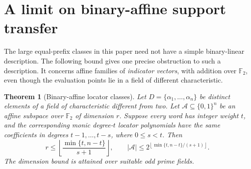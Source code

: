 \documentclass[11pt,letterpaper]{article}
\newtheorem{theorem}{Theorem}[section]
\theoremstyle{definition}
\theoremstyle{remark}
\begin{document}
\section{A limit on binary-affine support transfer}
\label{app:binary-affine}

The large equal-prefix classes in this paper need not have a simple
binary-linear description. The following bound gives one precise
obstruction to such a description. It concerns affine families of
\emph{indicator vectors}, with addition over $\mathbb F_2$, even
though the evaluation points lie in a field of different characteristic.

\begin{theorem}[Binary-affine locator classes]
\label{thm:binary-affine-locator}
Let $D=\{\alpha_1,\ldots,\alpha_n\}$ be distinct elements of a field
of characteristic different from two. Let $\mathcal A\subseteq\{0,1\}^n$
be an affine subspace over $\mathbb F_2$ of dimension $r$.
Suppose every word has integer weight $t$, and the corresponding
monic degree-$t$ locator polynomials have the same coefficients in
degrees $t-1,\ldots,t-s$, where $0\le s<t$. Then
\[
 r\le\left\lfloor\frac{\min\{t,n-t\}}{s+1}\right\rfloor,
 \qquad
 |\mathcal A|\le
 2^{\left\lfloor\min\{t,n-t\}/(s+1)\right\rfloor}.
\]
The dimension bound is attained over suitable odd prime fields.
\end{theorem}
\end{document}

